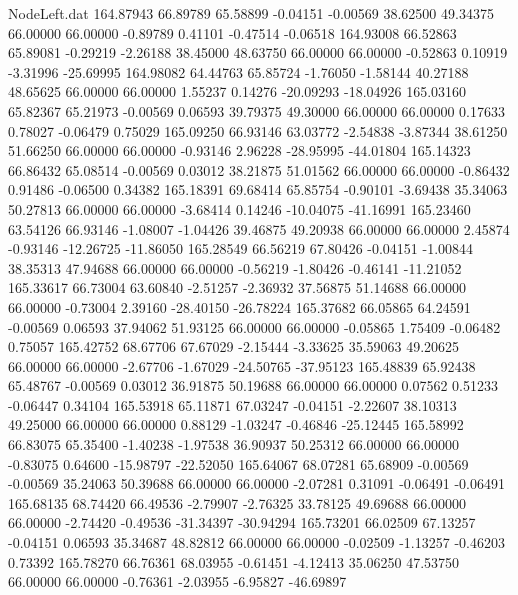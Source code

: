\begin{filecontents}{NodeLeft.dat}
 164.87943   66.89789   65.58899    -0.04151   -0.00569   38.62500   49.34375   66.00000   66.00000   -0.89789    0.41101   -0.47514   -0.06518
 164.93008   66.52863   65.89081    -0.29219   -2.26188   38.45000   48.63750   66.00000   66.00000   -0.52863    0.10919   -3.31996  -25.69995
 164.98082   64.44763   65.85724    -1.76050   -1.58144   40.27188   48.65625   66.00000   66.00000    1.55237    0.14276  -20.09293  -18.04926
 165.03160   65.82367   65.21973    -0.00569    0.06593   39.79375   49.30000   66.00000   66.00000    0.17633    0.78027   -0.06479    0.75029
 165.09250   66.93146   63.03772    -2.54838   -3.87344   38.61250   51.66250   66.00000   66.00000   -0.93146    2.96228  -28.95995  -44.01804
 165.14323   66.86432   65.08514    -0.00569    0.03012   38.21875   51.01562   66.00000   66.00000   -0.86432    0.91486   -0.06500    0.34382
 165.18391   69.68414   65.85754    -0.90101   -3.69438   35.34063   50.27813   66.00000   66.00000   -3.68414    0.14246  -10.04075  -41.16991
 165.23460   63.54126   66.93146    -1.08007   -1.04426   39.46875   49.20938   66.00000   66.00000    2.45874   -0.93146  -12.26725  -11.86050
 165.28549   66.56219   67.80426    -0.04151   -1.00844   38.35313   47.94688   66.00000   66.00000   -0.56219   -1.80426   -0.46141  -11.21052
 165.33617   66.73004   63.60840    -2.51257   -2.36932   37.56875   51.14688   66.00000   66.00000   -0.73004    2.39160  -28.40150  -26.78224
 165.37682   66.05865   64.24591    -0.00569    0.06593   37.94062   51.93125   66.00000   66.00000   -0.05865    1.75409   -0.06482    0.75057
 165.42752   68.67706   67.67029    -2.15444   -3.33625   35.59063   49.20625   66.00000   66.00000   -2.67706   -1.67029  -24.50765  -37.95123
 165.48839   65.92438   65.48767    -0.00569    0.03012   36.91875   50.19688   66.00000   66.00000    0.07562    0.51233   -0.06447    0.34104
 165.53918   65.11871   67.03247    -0.04151   -2.22607   38.10313   49.25000   66.00000   66.00000    0.88129   -1.03247   -0.46846  -25.12445
 165.58992   66.83075   65.35400    -1.40238   -1.97538   36.90937   50.25312   66.00000   66.00000   -0.83075    0.64600  -15.98797  -22.52050
 165.64067   68.07281   65.68909    -0.00569   -0.00569   35.24063   50.39688   66.00000   66.00000   -2.07281    0.31091   -0.06491   -0.06491
 165.68135   68.74420   66.49536    -2.79907   -2.76325   33.78125   49.69688   66.00000   66.00000   -2.74420   -0.49536  -31.34397  -30.94294
 165.73201   66.02509   67.13257    -0.04151    0.06593   35.34687   48.82812   66.00000   66.00000   -0.02509   -1.13257   -0.46203    0.73392
 165.78270   66.76361   68.03955    -0.61451   -4.12413   35.06250   47.53750   66.00000   66.00000   -0.76361   -2.03955   -6.95827  -46.69897

\end{filecontents}
